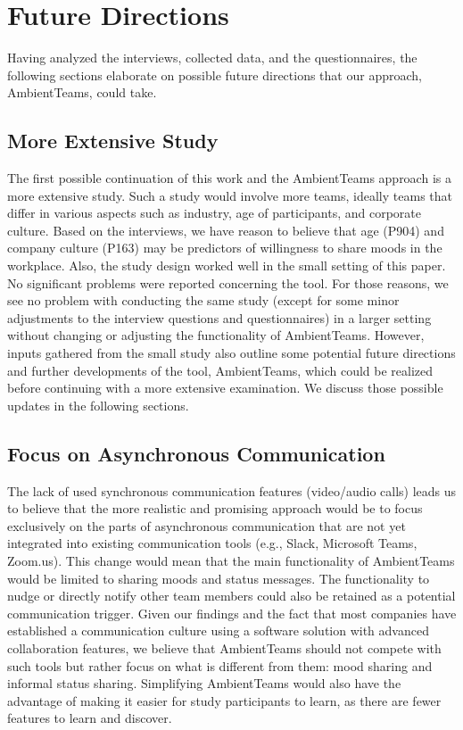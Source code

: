\chapter{Future Directions}
Having analyzed the interviews, collected data, and the questionnaires, the following sections elaborate on possible future directions that our approach, AmbientTeams, could take.

\label{chapter:future_directions}

\section{More Extensive Study}
The first possible continuation of this work and the AmbientTeams approach is a more extensive study. Such a study would involve more teams, ideally teams that differ in various aspects such as industry, age of participants, and corporate culture. Based on the interviews, we have reason to believe that age (P904) and company culture (P163) may be predictors of willingness to share moods in the workplace. Also, the study design worked well in the small setting of this paper. No significant problems were reported concerning the tool. For those reasons, we see no problem with conducting the same study (except for some minor adjustments to the interview questions and questionnaires) in a larger setting without changing or adjusting the functionality of AmbientTeams. However, inputs gathered from the small study also outline some potential future directions and further developments of the tool, AmbientTeams, which could be realized before continuing with a more extensive examination. We discuss those possible updates in the following sections.


\section{Focus on Asynchronous Communication}
The lack of used synchronous communication features (video/audio calls) leads us to believe that the more realistic and promising approach would be to focus exclusively on the parts of asynchronous communication that are not yet integrated into existing communication tools (e.g., Slack, Microsoft Teams, Zoom.us). This change would mean that the main functionality of AmbientTeams would be limited to sharing moods and status messages. The functionality to nudge or directly notify other team members could also be retained as a potential communication trigger. Given our findings and the fact that most companies have established a communication culture using a software solution with advanced collaboration features, we believe that AmbientTeams should not compete with such tools but rather focus on what is different from them: mood sharing and informal status sharing. Simplifying AmbientTeams would also have the advantage of making it easier for study participants to learn, as there are fewer features to learn and discover.

